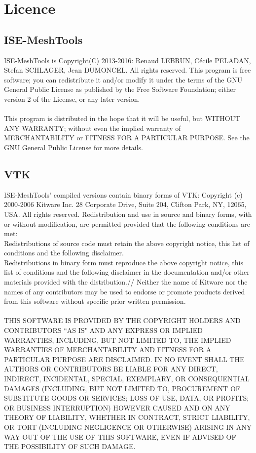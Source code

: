 \chapter{Licence}
    \minitoc
		\section{ISE-MeshTools}
ISE-MeshTools is Copyright(C) 2013-2016: Renaud LEBRUN, Cécile PELADAN, Stefan SCHLAGER, Jean DUMONCEL. All rights reserved.
This program is free software; you can redistribute it and/or modify it under the terms of the GNU 
General Public License as published by the Free Software Foundation; either version 2 of the License, 
or any later version.\\\\
This program is distributed in the hope that it will be useful, but WITHOUT ANY WARRANTY; without 
even the implied warranty of MERCHANTABILITY or FITNESS FOR A PARTICULAR PURPOSE. See the 
GNU General Public License for more details.

    \section{VTK}
  ISE-MeshTools' compiled versions contain binary forms of VTK: Copyright (c) 2000-2006 Kitware Inc. 28 
Corporate Drive, Suite 204, Clifton Park, NY, 12065, USA. All rights reserved. Redistribution and use 
in source and binary forms, with or without modification, are permitted provided that the following 
conditions are met:\\
    Redistributions of source code must retain the above copyright notice, this list of conditions and 
the following disclaimer.\\
    Redistributions in binary form must reproduce the above copyright notice, this list of conditions 
and the following disclaimer in the documentation and/or other materials provided with the distribution.//
    Neither the name of Kitware nor the names of any contributors may be used to endorse or promote products derived from this software without specific prior written permission.\\\\
THIS SOFTWARE IS PROVIDED BY THE COPYRIGHT HOLDERS AND CONTRIBUTORS ``AS IS" AND ANY 
EXPRESS OR IMPLIED WARRANTIES, INCLUDING, BUT NOT LIMITED TO, THE IMPLIED WARRANTIES 
OF MERCHANTABILITY AND FITNESS FOR A PARTICULAR PURPOSE ARE DISCLAIMED. IN NO EVENT 
SHALL THE AUTHORS OR CONTRIBUTORS BE LIABLE FOR ANY DIRECT, INDIRECT, INCIDENTAL, SPECIAL, 
EXEMPLARY, OR CONSEQUENTIAL DAMAGES (INCLUDING, BUT NOT LIMITED TO, PROCUREMENT OF 
SUBSTITUTE GOODS OR SERVICES; LOSS OF USE, DATA, OR PROFITS; OR BUSINESS INTERRUPTION) 
HOWEVER CAUSED AND ON ANY THEORY OF LIABILITY, WHETHER IN CONTRACT, STRICT LIABILITY, 
OR TORT (INCLUDING NEGLIGENCE OR OTHERWISE) ARISING IN ANY WAY OUT OF THE USE OF THIS 
SOFTWARE, EVEN IF ADVISED OF THE POSSIBILITY OF SUCH DAMAGE.
